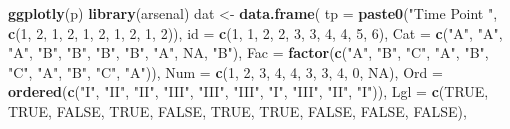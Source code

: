 \documentclass[
]{article}
\newenvironment{Shaded}{\begin{snugshade}}{\end{snugshade}}
\newcommand{\DataTypeTok}[1]{\textcolor[rgb]{0.00,0.34,0.68}{#1}}
\newcommand{\DecValTok}[1]{\textcolor[rgb]{0.69,0.50,0.00}{#1}}
\newcommand{\KeywordTok}[1]{\textcolor[rgb]{0.12,0.11,0.11}{\textbf{#1}}}
\newcommand{\NormalTok}[1]{\textcolor[rgb]{0.12,0.11,0.11}{#1}}
\newcommand{\OtherTok}[1]{\textcolor[rgb]{0.00,0.43,0.16}{#1}}
\newcommand{\StringTok}[1]{\textcolor[rgb]{0.75,0.01,0.01}{#1}}
\begin{document}
\begin{Shaded}
\begin{Highlighting}[]
{{{{{{{{{{{{{{{{{{{{{{{{{{{{{{{{{{{{{{{{{{{{{{{{{{{{{{{{{{{{{{{{{{{{{{{{{{{{{{{{{{{{{{{{{{{{{{{{{{{{{{{{{{{{{{{{{{{{{{{{{{{{{{{{{{{{{{{{{{{{{{{{{{{{{{{{{{{{{{{{{{{{{{{{{{{{{{{{{{{{{{{{{{{{{{{{{{{{{{{{{{{{{{{{{{{{{{{{{{{{{{{{{{{{{{{{{{{{{{{{{{{{{{{{{{{{{{{\KeywordTok{ggplotly}\NormalTok{(p)}
\KeywordTok{library}\NormalTok{(arsenal)}
\NormalTok{dat <-}\StringTok{ }\KeywordTok{data.frame}\NormalTok{(}
  \DataTypeTok{tp =} \KeywordTok{paste0}\NormalTok{(}\StringTok{"Time Point "}\NormalTok{, }\KeywordTok{c}\NormalTok{(}\DecValTok{1}\NormalTok{, }\DecValTok{2}\NormalTok{, }\DecValTok{1}\NormalTok{, }\DecValTok{2}\NormalTok{, }\DecValTok{1}\NormalTok{, }\DecValTok{2}\NormalTok{, }\DecValTok{1}\NormalTok{, }\DecValTok{2}\NormalTok{, }\DecValTok{1}\NormalTok{, }\DecValTok{2}\NormalTok{)),}
  \DataTypeTok{id =} \KeywordTok{c}\NormalTok{(}\DecValTok{1}\NormalTok{, }\DecValTok{1}\NormalTok{, }\DecValTok{2}\NormalTok{, }\DecValTok{2}\NormalTok{, }\DecValTok{3}\NormalTok{, }\DecValTok{3}\NormalTok{, }\DecValTok{4}\NormalTok{, }\DecValTok{4}\NormalTok{, }\DecValTok{5}\NormalTok{, }\DecValTok{6}\NormalTok{),}
  \DataTypeTok{Cat =} \KeywordTok{c}\NormalTok{(}\StringTok{"A"}\NormalTok{, }\StringTok{"A"}\NormalTok{, }\StringTok{"A"}\NormalTok{, }\StringTok{"B"}\NormalTok{, }\StringTok{"B"}\NormalTok{, }\StringTok{"B"}\NormalTok{, }\StringTok{"B"}\NormalTok{, }\StringTok{"A"}\NormalTok{, }\OtherTok{NA}\NormalTok{, }\StringTok{"B"}\NormalTok{),}
  \DataTypeTok{Fac =} \KeywordTok{factor}\NormalTok{(}\KeywordTok{c}\NormalTok{(}\StringTok{"A"}\NormalTok{, }\StringTok{"B"}\NormalTok{, }\StringTok{"C"}\NormalTok{, }\StringTok{"A"}\NormalTok{, }\StringTok{"B"}\NormalTok{, }\StringTok{"C"}\NormalTok{, }\StringTok{"A"}\NormalTok{, }\StringTok{"B"}\NormalTok{, }\StringTok{"C"}\NormalTok{, }\StringTok{"A"}\NormalTok{)),}
  \DataTypeTok{Num =} \KeywordTok{c}\NormalTok{(}\DecValTok{1}\NormalTok{, }\DecValTok{2}\NormalTok{, }\DecValTok{3}\NormalTok{, }\DecValTok{4}\NormalTok{, }\DecValTok{4}\NormalTok{, }\DecValTok{3}\NormalTok{, }\DecValTok{3}\NormalTok{, }\DecValTok{4}\NormalTok{, }\DecValTok{0}\NormalTok{, }\OtherTok{NA}\NormalTok{),}
  \DataTypeTok{Ord =} \KeywordTok{ordered}\NormalTok{(}\KeywordTok{c}\NormalTok{(}\StringTok{"I"}\NormalTok{, }\StringTok{"II"}\NormalTok{, }\StringTok{"II"}\NormalTok{, }\StringTok{"III"}\NormalTok{, }\StringTok{"III"}\NormalTok{, }\StringTok{"III"}\NormalTok{, }\StringTok{"I"}\NormalTok{, }\StringTok{"III"}\NormalTok{, }\StringTok{"II"}\NormalTok{, }\StringTok{"I"}\NormalTok{)),}
  \DataTypeTok{Lgl =} \KeywordTok{c}\NormalTok{(}\OtherTok{TRUE}\NormalTok{, }\OtherTok{TRUE}\NormalTok{, }\OtherTok{FALSE}\NormalTok{, }\OtherTok{TRUE}\NormalTok{, }\OtherTok{FALSE}\NormalTok{, }\OtherTok{TRUE}\NormalTok{, }\OtherTok{TRUE}\NormalTok{, }\OtherTok{FALSE}\NormalTok{, }\OtherTok{FALSE}\NormalTok{, }\OtherTok{FALSE}\NormalTok{),}
}}}}}}}}}}}}}}}}}}}}}}}}}}}}}}}}}}}}}}}}}}}}}}}}}}}}}}}}}}}}}}}}}}}}}}}}}}}}}}}}}}}}}}}}}}}}}}}}}}}}}}}}}}}}}}}}}}}}}}}}}}}}}}}}}}}}}}}}}}}}}}}}}}}}}}}}}}}}}}}}}}}}}}}}}}}}}}}}}}}}}}}}}}}}}}}}}}}}}}}}}}}}}}}}}}}}}}}}}}}}}}}}}}}}}}}}}}}}}}}}}}}}}}}}}}}}}}}
\end{Highlighting}
\end{Shaded}
\end{document}
